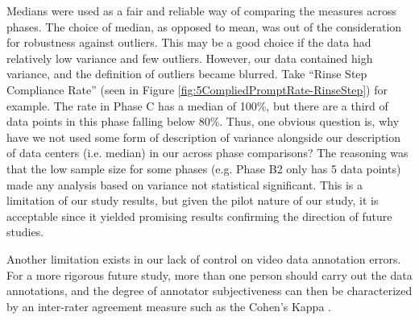 Medians were used as a fair and reliable way of comparing the measures across phases.  The choice of median, as opposed to mean, was out of the consideration for robustness against outliers.  This may be a good choice if the data had relatively low variance and few outliers.  However, our data contained high variance, and the definition of outliers became blurred.  Take ``Rinse Step Compliance Rate'' (seen in Figure \ref{fig:5CompliedPromptRate-RinseStep}) for example.  The rate in Phase C has a median of 100\%, but there are a third of data points in this phase falling below 80\%.  Thus, one obvious question is, why have we not used some form of description of variance alongside our description of data centers (i.e. median) in our across phase comparisons?  The reasoning was that the low sample size for some phases (e.g. Phase B2 only has 5 data points) made any analysis based on variance not statistical significant.  This is a limitation of our study results, but given the pilot nature of our study, it is acceptable since it yielded promising results confirming the direction of future studies.

Another limitation exists in our lack of control on video data annotation errors.  For a more rigorous future study, more than one person should carry out the data annotations, and the degree of annotator subjectiveness can then be characterized by an inter-rater agreement measure such as the Cohen's Kappa \cite{volkmar2005handbook}.

